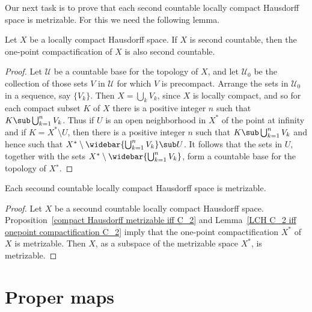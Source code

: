 Our next task is to prove that each second countable locally compact Hausdorff space is metrizable. For this we need the following lemma.
\begin{lemma}\label{LCH C_2 iff onepoint compactification C_2}
Let $X$ be a locally compact Hausdorff space. If $X$ is second countable, then the one-point compactification of $X$ is also second countable.
\end{lemma}
\begin{proof}
Let $\mathcal{U}$ be a countable base for the topology of $X$, and let $\mathcal{U}_0$ be the collection of those sets $V$ in $\mathcal{U}$ for which $V$ is precompact. Arrange the sets in $\mathcal{U}_0$ in a sequence, say $\{V_k\}$. Then $X=\bigcup_kV_k$, since $X$ is locally compact, and so for each compact subset $K$ of $X$ there is a positive integer $n$ such that $K\sub\bigcup_{k=1}^{n}V_k$. Thus if $U$ is an open neighborhood in $X^*$ of the point at infinity and if $K=X^*\setminus U$, then there is a positive integer $n$ such that $K\sub\bigcup_{k=1}^{n}V_k$ and hence such that $X^*\setminus\widebar{\bigcup_{k=1}^{n}V_k}\sub U$. It follows that the sets in $U$, together with the sets $X^*\setminus\widebar{\bigcup_{k=1}^{n}V_k}$, form a countable base for the topology of $X^∗$.
\end{proof}
\begin{proposition}\label{LCH C_2 is metrizable}
Each secound countable locally compact Hausdorff space is metrizable.
\end{proposition}
\begin{proof}
Let $X$ be a secound countable locally compact Hausdorff space. Proposition~\ref{compact Hausdorff metrizable iff C_2} and Lemma~\ref{LCH C_2 iff onepoint compactification C_2} imply that the one-point compactification $X^*$ of $X$ is metrizable. Then $X$, as a subspace of the metrizable space $X^*$, is metrizable.
\end{proof}
\section{Proper maps}
